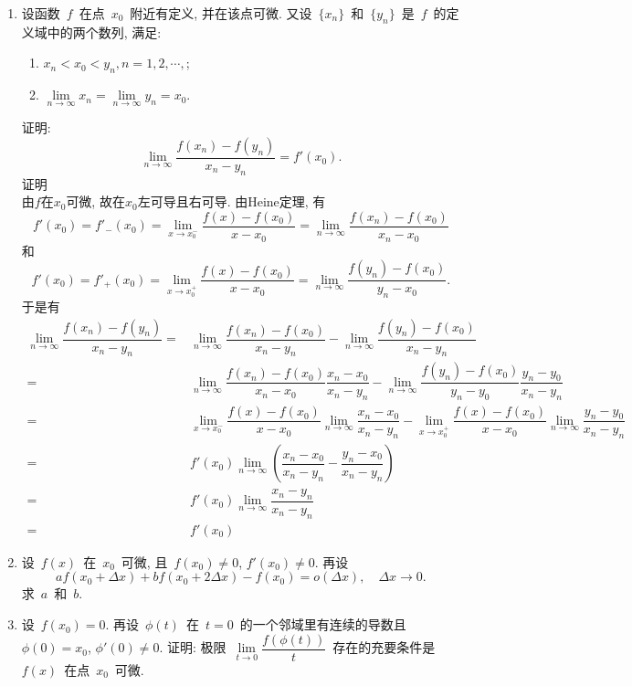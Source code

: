 \documentclass[UTF8,a4paper,20pt]{article}
\begin{document}
\begin{enumerate}
\item 设函数~$f$~在点~$x_0$~附近有定义, 并在该点可微. 又设~$\{x_n\}$~和~$\{y_n\}$~是~$f$~的定义域中的两个数列, 满足: 
	\begin{enumerate}[(1)]
	\item $x_n<x_0<y_n, n=1,2,\cdots,$;
	\item $\lim\limits_{n\to\infty}x_n=\lim\limits_{n\to\infty}y_n=x_0$.
	\end{enumerate}
证明: 
\[ \lim\limits_{n\to\infty}\dfrac{f(x_n)-f(y_n)}{x_n-y_n}=f'(x_0).\]
{\heiti 证明}\\
由$f$在$x_0$可微, 故在$x_0$左可导且右可导. 由Heine定理, 有
\[ f'(x_0)=f'_{-}(x_0)=\lim\limits_{x\to x_0^{-}}\dfrac{f(x)-f(x_0)}{x-x_0}=\lim\limits_{n\to\infty}\dfrac{f(x_n)-f(x_0)}{x_n-x_0}\]
和
\[ f'(x_0)=f'_{+}(x_0)=\lim\limits_{x\to x_0^{+}}\dfrac{f(x)-f(x_0)}{x-x_0}=\lim\limits_{n\to\infty}\dfrac{f(y_n)-f(x_0)}{y_n-x_0}.\]
于是有
\begin{equation*}
	\begin{split}
	\lim\limits_{n\to\infty}\dfrac{f(x_n)-f(y_n)}{x_n-y_n}=&\lim\limits_{n\to\infty}\dfrac{f(x_n)-f(x_0)}{x_n-y_n}-\lim\limits_{n\to\infty}\dfrac{f(y_n)-f(x_0)}{x_n-y_n}\\
	=&\lim\limits_{n\to\infty}\dfrac{f(x_n)-f(x_0)}{x_n-x_0}\dfrac{x_n-x_0}{x_n-y_n}-\lim\limits_{n\to\infty}\dfrac{f(y_n)-f(x_0)}{y_n-y_0}\dfrac{y_n-y_0}{x_n-y_n}\\
	=&\lim\limits_{x\to x_0^{-}}\dfrac{f(x)-f(x_0)}{x-x_0}\lim\limits_{n\to\infty}\dfrac{x_n-x_0}{x_n-y_n}-\lim\limits_{x\to x_0^{+}}\dfrac{f(x)-f(x_0)}{x-x_0}\lim\limits_{n\to\infty}\dfrac{y_n-y_0}{x_n-y_n}\\
	=&f'(x_0)\lim\limits_{n\to\infty}\left(\dfrac{x_n-x_0}{x_n-y_n}-\dfrac{y_n-x_0}{x_n-y_n}\right)\\
	=&f'(x_0)\lim\limits_{n\to\infty}\dfrac{x_n-y_n}{x_n-y_n}\\
	=&f'(x_0)
	\end{split}
\end{equation*}

\item 设~$f(x)$~在~$x_0$~可微, 且~$f(x_0)\neq 0$, $f'(x_0)\neq 0$. 再设
\[ af(x_0+\Delta x)+bf(x_0+2\Delta x)-f(x_0)=o(\Delta x), \quad \Delta x\to 0.\]
求~$a$~和~$b$.

\item 设~$f(x_0)=0$. 再设~$\phi(t)$~在~$t=0$~的一个邻域里有连续的导数且~$\phi(0)=x_0$, $\phi'(0)\neq 0$. 证明: 极限~$\lim\limits_{t\to 0}\dfrac{f(\phi(t))}{t}$~存在的充要条件是~$f(x)$~在点~$x_0$~可微.


\end{enumerate}
\end{document}

